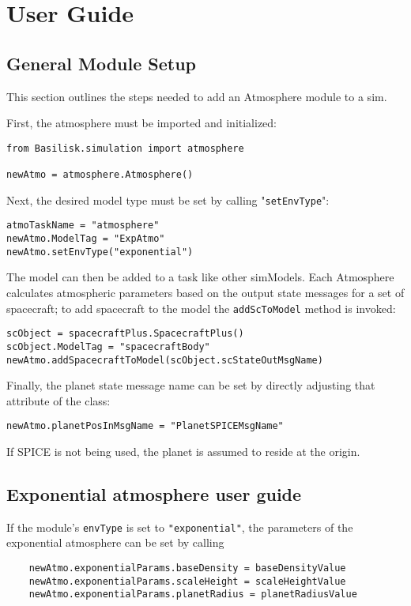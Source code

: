 
\section{User Guide}

\subsection{General Module Setup}
This section outlines the steps needed to add an Atmosphere module to a sim.

First, the atmosphere must be imported and initialized:
\begin{verbatim}
from Basilisk.simulation import atmosphere

newAtmo = atmosphere.Atmosphere()
\end{verbatim}

Next, the desired model type must be set by calling "\verb|setEnvType|":
\begin{verbatim}
atmoTaskName = "atmosphere"
newAtmo.ModelTag = "ExpAtmo"
newAtmo.setEnvType("exponential")
\end{verbatim}

The model can then be added to a task like other simModels. Each Atmosphere calculates atmospheric parameters based on the output state messages for a set of spacecraft; to add spacecraft to the model the \verb|addScToModel| method is invoked:

\begin{verbatim}
scObject = spacecraftPlus.SpacecraftPlus()
scObject.ModelTag = "spacecraftBody"
newAtmo.addSpacecraftToModel(scObject.scStateOutMsgName)
\end{verbatim}

Finally, the planet state message name can be set by directly adjusting that attribute of the class:
\begin{verbatim}
newAtmo.planetPosInMsgName = "PlanetSPICEMsgName"
\end{verbatim}
If SPICE is not being used, the planet is assumed to reside at the origin.

\subsection{Exponential atmosphere user guide}
If the module's \verb|envType| is set to \verb|"exponential"|, the parameters of the exponential atmosphere can be set by calling
\begin{verbatim}
    newAtmo.exponentialParams.baseDensity = baseDensityValue
    newAtmo.exponentialParams.scaleHeight = scaleHeightValue
    newAtmo.exponentialParams.planetRadius = planetRadiusValue
\end{verbatim}